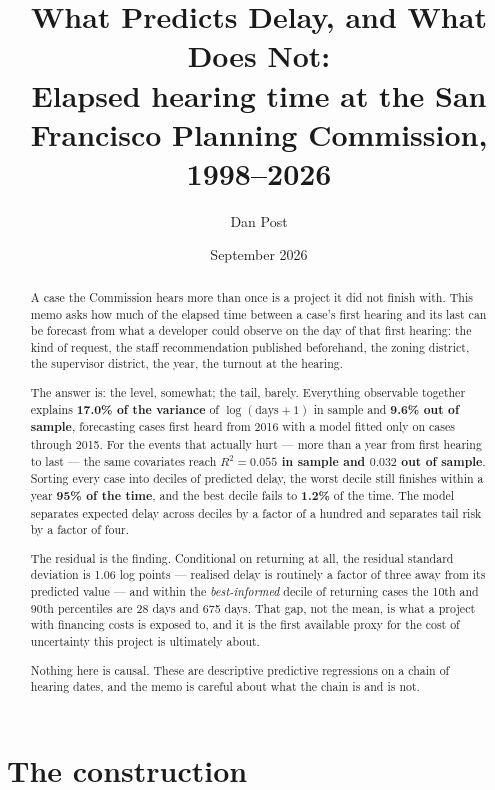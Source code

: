 \documentclass[11pt]{article}
\title{What Predicts Delay, and What Does Not:\\
\large Elapsed hearing time at the San Francisco Planning Commission, 1998--2026}
\author{Dan Post}
\date{September 2026}
\begin{document}
\maketitle

\begin{abstract}
\noindent
A case the Commission hears more than once is a project it did not finish with. This memo asks
how much of the elapsed time between a case's first hearing and its last can be forecast from
what a developer could observe on the day of that first hearing: the kind of request, the
staff recommendation published beforehand, the zoning district, the supervisor district, the
year, the turnout at the hearing.

\medskip\noindent
The answer is: the level, somewhat; the tail, barely. Everything observable together explains
\textbf{17.0\% of the variance} of $\log(\text{days}+1)$ in sample and \textbf{9.6\% out of
sample}, forecasting cases first heard from 2016 with a model fitted only on cases through
2015. For the events that actually hurt --- more than a year from first hearing to last ---
the same covariates reach \textbf{$R^2=0.055$ in sample and $0.032$ out of sample}. Sorting
every case into deciles of predicted delay, the worst decile still finishes within a year
\textbf{95\% of the time}, and the best decile fails to \textbf{1.2\%} of the time. The model
separates expected delay across deciles by a factor of a hundred and separates tail risk by a
factor of four.

\medskip\noindent
The residual is the finding. Conditional on returning at all, the residual standard deviation
is 1.06 log points --- realised delay is routinely a factor of three away from its predicted
value --- and within the \emph{best-informed} decile of returning cases the 10th and 90th
percentiles are 28 days and 675 days. That gap, not the mean, is what a project with
financing costs is exposed to, and it is the first available proxy for the cost of
uncertainty this project is ultimately about.

\medskip\noindent
Nothing here is causal. These are descriptive predictive regressions on a chain of hearing
dates, and the memo is careful about what the chain is and is not.
\end{abstract}

\tableofcontents
\newpage

\section{The construction}
\end{document}
